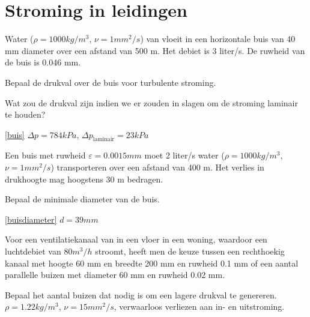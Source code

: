 \chapter{Stroming in leidingen}
\label{sec:Stroming in leidingen}
\begin{toepassing}
	\label{buis}
Water ($\rho=1000\unit{kg/m^3}$, $\nu=1\unit{mm^2/s}$) van vloeit in een horizontale buis van 40 mm diameter over een afstand van 500 m. Het debiet is 3 liter/s.  De ruwheid van de buis is 0.046 mm.
		
Bepaal de drukval over de buis voor turbulente stroming.
		
Wat zou de drukval zijn indien we er zouden in slagen om de stroming laminair te houden?
\end{toepassing}
\begin{antwoord}{\ref{buis}}
	$\Delta p = 784\unit{kPa}$, $\Delta p_{\text{laminair}} = 23\unit{kPa}$
\end{antwoord}
\begin{toepassing}[*]
	\label{buisdiameter}
Een buis met ruwheid $\varepsilon = 0.0015\unit{mm}$ moet 2 liter/s water ($\rho=1000\unit{kg/m^3}$, $\nu=1\unit{mm^2/s}$) transporteren over een afstand van 400 m.  Het verlies in drukhoogte mag hoogstens 30 m bedragen.
		
Bepaal de minimale diameter van de buis.
\end{toepassing}
\begin{antwoord}{\ref{buisdiameter}}
	$d = 39\unit{mm}$
\end{antwoord}
\begin{toepassing}
	\label{ventilatiekanaal}
Voor een ventilatiekanaal van in een vloer in een woning, waardoor een luchtdebiet van $80\unit{m^3/h}$ stroomt, heeft men de keuze tussen een rechthoekig kanaal met hoogte 60 mm en breedte 200 mm en ruwheid 0.1 mm of een aantal parallelle buizen met diameter 60 mm en ruwheid 0.02 mm. 
		
Bepaal het aantal buizen dat nodig is om een lagere drukval te genereren. $\rho = 1.22\unit{kg/m^3}$, $\nu = 15\unit{mm^2/s}$, verwaarloos verliezen aan in- en uitstroming.
\end{toepassing}
